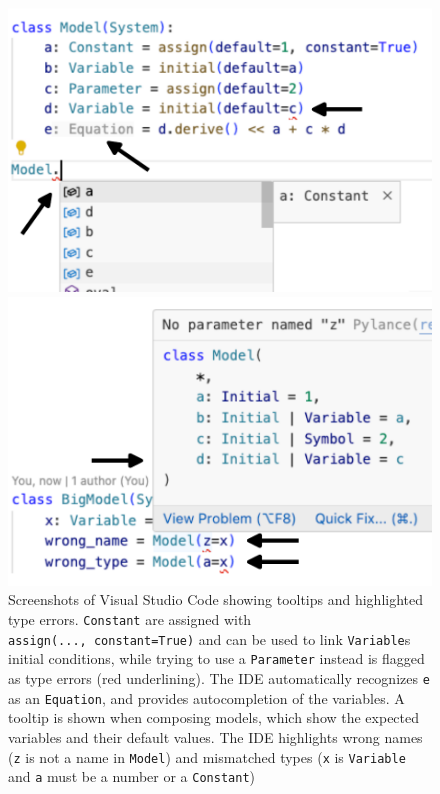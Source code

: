 \documentclass[
  letterpaper,
  DIV=11,
  numbers=noendperiod]{scrartcl}
\begin{document}
\begin{figure}

\begin{minipage}[b]{0.50\linewidth}

{\centering 

\includegraphics{src/ide/ide1.pdf}

}

\end{minipage}%
%
\begin{minipage}[b]{0.50\linewidth}

{\centering 

\includegraphics{src/ide/ide2.pdf}

}

\end{minipage}%

\caption{\label{fig-ide}Screenshots of Visual Studio Code showing
tooltips and highlighted type errors. \texttt{Constant} are assigned
with \texttt{assign(...,\ constant=True)} and can be used to link
\texttt{Variable}s initial conditions, while trying to use a
\texttt{Parameter} instead is flagged as type errors (red underlining).
The IDE automatically recognizes \texttt{e} as an \texttt{Equation}, and
provides autocompletion of the variables. A tooltip is shown when
composing models, which show the expected variables and their default
values. The IDE highlights wrong names (\texttt{z} is not a name in
\texttt{Model}) and mismatched types (\texttt{x} is \texttt{Variable}
and \texttt{a} must be a number or a \texttt{Constant})}

\end{figure}
\end{document}
